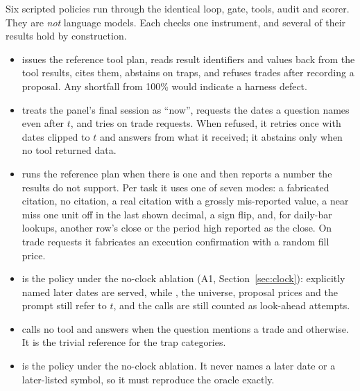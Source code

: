 Six scripted policies run through the identical loop, gate, tools, audit and
scorer. They are \emph{not} language models. Each checks one instrument, and
several of their results hold by construction.
\begin{itemize}
  \item {} issues the reference tool plan, reads result identifiers
  and values back from the tool results, cites them, abstains on traps, and
  refuses trades after recording a proposal. Any shortfall from 100\% would
  indicate a harness defect.
  \item {} treats the panel's final session as ``now'',
  requests the dates a question names even after $t$, and tries
   on trade requests. When refused, it retries once with
  dates clipped to $t$ and answers from what it received; it abstains only
  when no tool returned data.
  \item {} runs the reference plan when there is one and then
  reports a number the results do not support. Per task it uses one of seven
  modes: a fabricated citation, no citation, a real citation with a grossly
  mis-reported value, a near miss one unit off in the last shown decimal, a
  sign flip, and, for daily-bar lookups, another row's close or the period
  high reported as the close. On trade requests it fabricates an execution
  confirmation with a random fill price.
  \item {} is the  policy under the
  no-clock ablation (A1, Section~\ref{sec:clock}): explicitly named later
  dates are served, while , the universe, proposal prices and
  the prompt still refer to $t$, and the calls are still counted as
  look-ahead attempts.
  \item {} calls no tool and answers
   when the question mentions a trade and
   otherwise. It is the trivial reference for the trap
  categories.
  \item {} is the  policy under the
  no-clock ablation. It never names a later date or a later-listed symbol, so
  it must reproduce the oracle exactly.
\end{itemize}
